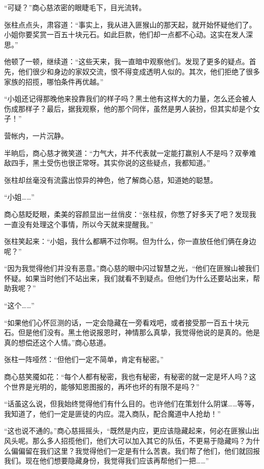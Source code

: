 
\begin{this_body}



“可疑？”商心慈浓密的眼睫毛下，目光流转。

张柱点点头，肃容道：“事实上，我从进入匪猴山的那天起，就开始怀疑他们了。小姐你要奖赏一百五十块元石。如此巨款，他们却一点都不心动。这实在发人深思。”

他顿了一顿，继续道：“这些天来，我一直暗中观察他们。发现了更多的疑点。首先，他们很少和身边的家奴交流，恨不得变成透明人似的。其次，他们拒绝了很多家族的招揽，哪怕条件再优越。”

“小姐还记得那晚他来投靠我们的样子吗？黑土他有这样大的力量，怎么还会被人伤成那样子？最后，据我观察，他的那个同伴，虽然是男人装扮，但其实却是个女子！”

营帐内，一片沉静。

半晌后，商心慈才微笑道：“力气大，并不代表就一定能打赢别人不是吗？双拳难敌四手，黑土受伤也很正常呀。其实你说的这些疑点，我都知道。”

张柱却丝毫没有流露出惊异的神色，他了解商心慈，知道她的聪慧。

“小姐……”

商心慈眨眨眼，柔美的容颜显出一丝俏皮：“张柱叔，你憋了好多天了吧？发现我一直没有处理这个事情，所以今天就来提醒我。”

张柱笑起来：“小姐，我什么都瞒不过你啊。但为什么，你一直放任他们俩在身边呢？”

“因为我觉得他们并没有恶意。”商心慈的眼中闪过智慧之光，“他们在匪猴山被我们怀疑。如果当时他们不站出来，我们就看不到疑点。但他们为什么还要站出来，帮助我呢？”

“这个……”

“如果他们心怀叵测的话，一定会隐藏在一旁看戏吧，或者接受那一百五十块元石。但是他们没有。黑土他说报恩时，神情那么真挚，我觉得他说的是真的。他是真的想偿还这个人情。”商心慈道。

张柱一阵哑然：“但他们一定不简单，肯定有秘密。”

商心慈笑魇如花：“每个人都有秘密，我也有秘密，有秘密的就一定是坏人吗？这个世界是光明的，能够知恩图报的，再坏也坏的有限不是吗？”

“话虽这么说，但我始终觉得他们有什么目的。也许他们在策划什么阴谋……等等，我知道了，他们一定是匪徒的内应。混入商队，配合魔道中人抢劫！”

“这也说不通的。”商心慈摇摇头，“既然是内应，更应该隐藏起来，何必在匪猴山出风头呢。那么多人招揽他们，他们大可以加入其它的队伍，不更易于隐藏吗？为什么偏偏留在我们这里？我觉得他们一定是有什么苦衷。我们帮了他们，他们就回报我们。现在他们想要隐藏身份，我觉得我们应该再帮他们一把……”


\end{this_body}
